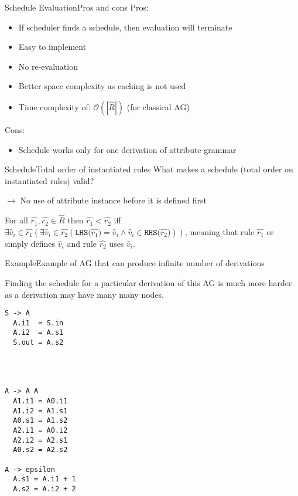 \begin{frame}{Schedule Evaluation}{Pros and cons}
Pros:
\begin{itemize}
    \item If scheduler finds a schedule, then evaluation \alert{will terminate}
    \item Easy to implement
    \item \alert{No re-evaluation}
    \item Better space complexity as caching is not used
    \item Time complexity of: $\mathcal{O}(| \hat{R} |)$ (for classical AG)
\end{itemize}

Cons:
\begin{itemize}
    \item Schedule \alert{works only for one derivation} of attribute grammar
\end{itemize}
\end{frame}


\begin{frame}{Schedule}{Total order of instantiated rules}
What makes a schedule (total order on instantiated rules) valid?

$\to$ \alert{No use of attribute instance before it is defined first}

\newlinevspace

\begin{definition}
For all $\hat{r_1}, \hat{r_2} \in \hat R$ then  $\hat{r_1} < \hat{r_2}$ iff $\exists \hat{v}_i \in \hat{r_1} (\exists \hat{v}_i \in \hat{r_2} (\texttt{LHS($\hat{r_1}$)} = \hat{v}_i \wedge \hat{v}_i \in \texttt{RHS($\hat{r_2}$)} ))$, meaning that rule $\hat{r_1}$ or simply defines $\hat{v}_i$ and rule $\hat{r_2}$ uses $\hat{v}_i$.
\end{definition}
\end{frame}


\begin{frame}[fragile=singleslide]{Example}{Example of AG that can produce infinite number of derivations}

Finding the schedule for a particular derivation of this AG is much more harder as a derivation may have many many nodes. 

\begin{multicols}{3}
\begin{Verbatim}[fontsize=\small]
S -> A
  A.i1  = S.in
  A.i2  = A.s1
  S.out = A.s2




A -> A A
  A1.i1 = A0.i1
  A1.i2 = A1.s1
  A0.s1 = A1.s2
  A2.i1 = A0.i2
  A2.i2 = A2.s1
  A0.s2 = A2.s2

A -> epsilon
  A.s1 = A.i1 + 1
  A.s2 = A.i2 + 2
    
    
    
    
\end{Verbatim}
\end{multicols}

\end{frame}




